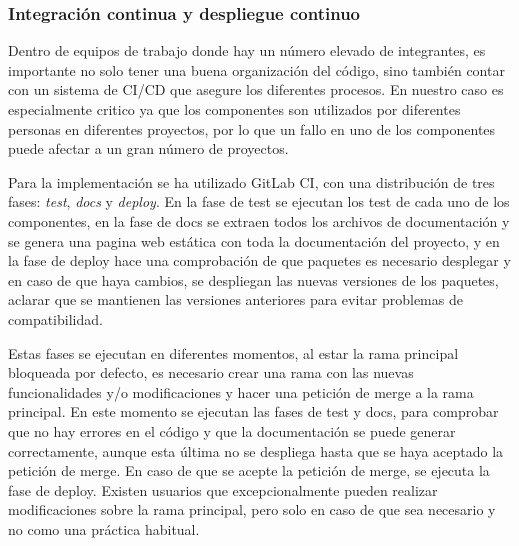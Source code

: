 \subsubsection{Integración continua y despliegue continuo}
Dentro de equipos de trabajo donde hay un número elevado de integrantes, es
importante no solo tener una buena organización del código, sino también
contar con un sistema de CI/CD que asegure los diferentes procesos. En nuestro
caso es especialmente critico ya que los componentes son utilizados por
diferentes personas en diferentes proyectos, por lo que un fallo en uno de
los componentes puede afectar a un gran número de proyectos.\medskip

Para la implementación se ha utilizado GitLab CI, con una distribución de 
tres fases: \textit{test}, \textit{docs} y \textit{deploy}. En la fase de test
se ejecutan los test de cada uno de los componentes, en la fase de docs se
extraen todos los archivos de documentación y se genera una pagina web estática
con toda la documentación del proyecto, y en la fase de deploy hace una comprobación
de que paquetes es necesario desplegar y en caso de que haya cambios, se despliegan
las nuevas versiones de los paquetes, aclarar que se mantienen las versiones anteriores
para evitar problemas de compatibilidad.\medskip

Estas fases se ejecutan en diferentes momentos, al estar la rama principal bloqueada
por defecto, es necesario crear una rama con las nuevas funcionalidades y/o modificaciones
y hacer una petición de merge a la rama principal. En este momento se ejecutan las fases
de test y docs, para comprobar que no hay errores en el código y que la documentación
se puede generar correctamente, aunque esta última no se despliega hasta que se haya
aceptado la petición de merge. En caso de que se acepte la petición de merge, se ejecuta
la fase de deploy. Existen usuarios que excepcionalmente pueden realizar modificaciones
sobre la rama principal, pero solo en caso de que sea necesario y no como una práctica
habitual. 